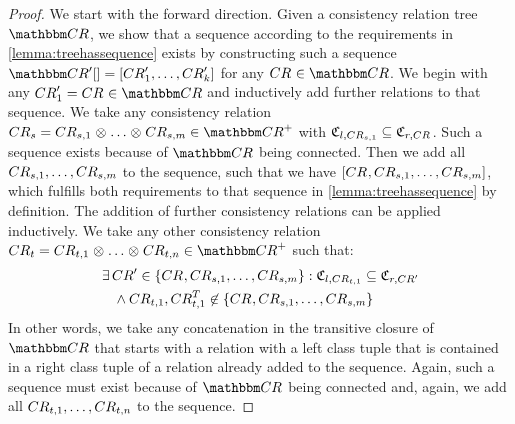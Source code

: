 \begin{proof}
    We start with the forward direction.
    Given a consistency relation tree $\consistencyrelationset{CR}$, we show that a sequence according to the requirements in \autoref{lemma:treehassequence} exists by constructing such a sequence $\sequence{\consistencyrelationset{CR}'} = \sequenced{\consistencyrelation{CR}{1}', \dots, \consistencyrelation{CR}{k}'}$ for any $\consistencyrelation{CR}{} \in \consistencyrelationset{CR}$.
    We begin with any $\consistencyrelation{CR}{1}' = \consistencyrelation{CR}{} \in \consistencyrelationset{CR}$ and inductively add further relations to that sequence.
    We take any consistency relation $\consistencyrelation{CR}{s} = \consistencyrelation{CR}{s,1} \concat \dots \concat \consistencyrelation{CR}{s,m} \in \transitiveclosure{\consistencyrelationset{CR}}$ with $\classtuple{C}{l,\consistencyrelation{CR}{s,1}} \subseteq \classtuple{C}{r,\consistencyrelation{CR}{}}$. 
    Such a sequence exists because of $\consistencyrelationset{CR}$ being connected.
    Then we add all $\consistencyrelation{CR}{s,1}, \dots, \consistencyrelation{CR}{s,m}$ to the sequence, such that we have $\sequenced{\consistencyrelation{CR}{}, \consistencyrelation{CR}{s,1}, \dots, \consistencyrelation{CR}{s,m}}$, which fulfills both requirements to that sequence in \autoref{lemma:treehassequence} by definition.
    The addition of further consistency relations can be applied inductively.
    We take any other consistency relation $\consistencyrelation{CR}{t} = \consistencyrelation{CR}{t,1} \concat \dots \concat \consistencyrelation{CR}{t,n} \in \transitiveclosure{\consistencyrelationset{CR}}$ such that:
    \begin{align*}
        &
        \exists \consistencyrelation{CR}{}' \in \setted{\consistencyrelation{CR}{}, \consistencyrelation{CR}{s,1}, \dots, \consistencyrelation{CR}{s,m}} :
        \classtuple{C}{l,\consistencyrelation{CR}{t,1}} \subseteq \classtuple{C}{r,\consistencyrelation{CR}{}'}\\
        & \formulaskip
        \land
        \consistencyrelation{CR}{t,1}, \consistencyrelation{CR}{t,1}^T \not\in \setted{\consistencyrelation{CR}{}, \consistencyrelation{CR}{s,1}, \dots, \consistencyrelation{CR}{s,m}}
    \end{align*}
    In other words, we take any concatenation in the transitive closure of $\consistencyrelationset{CR}$ that starts with a relation with a left class tuple that is contained in a right class tuple of a relation already added to the sequence.
    Again, such a sequence must exist because of $\consistencyrelationset{CR}$ being connected and, again, we add all $\consistencyrelation{CR}{t,1}, \dots, \consistencyrelation{CR}{t,n}$ to the sequence.

\end{proof}
